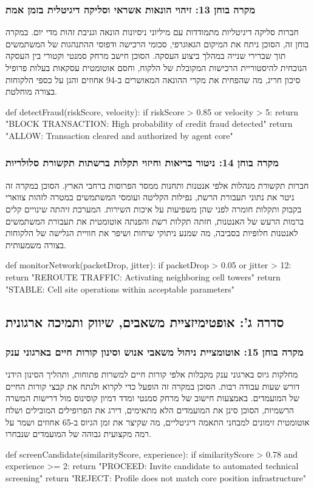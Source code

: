 \documentclass{hebrew-academic-template}
\begin{document}
\subsubsection{מקרה בוחן 13: זיהוי הונאות אשראי וסליקה דיגיטלית בזמן אמת}
חברות סליקה דיגיטליות מתמודדות עם מיליוני ניסיונות הונאה וגניבת זהות מדי יום. במקרה בוחן זה, הסוכן ניתח את המיקום הגאוגרפי, סכומי הרכישה ודפוסי ההתנהגות של המשתמשים תוך שברירי שנייה במהלך ביצוע העסקה. הסוכן חישב מרחק סמנטי וקטורי בין העסקה הנוכחית להיסטוריית הרכישות המקובלת של הלקוח, וחסם אוטומטית עסקאות בעלות פרופיל סיכון חריג, מה שהפחית את מקרי ההונאה המאושרים ב-94 אחוזים והגן על כספי הלקוחות בצורה מוחלטת.
\begin{pythonbox}
def detectFraud(riskScore, velocity):
    if riskScore > 0.85 or velocity > 5:
        return "BLOCK TRANSACTION: High probability of credit fraud detected"
    return "ALLOW: Transaction cleared and authorized by agent core"
\end{pythonbox}

\subsubsection{מקרה בוחן 14: ניטור בריאות וחיזוי תקלות ברשתות תקשורת סלולריות}
חברות תקשורת מנהלות אלפי אנטנות ותחנות ממסר הפרוסות ברחבי הארץ. הסוכן במקרה זה ניטר את נתוני תעבורת הרשת, נפילות הקליטה ועומסי המשתמשים במטרה לזהות צווארי בקבוק ותקלות חומרה לפני שהן משפיעות על איכות השירות. המערכת זיהתה שינויים קלים ברמות הרעש של האנטנות, חזתה תקלות רשת והפנתה אוטומטית את תעבורת המשתמשים לאנטנות חלופיות בסביבה, מה שמנע ניתוקי שיחות ושיפר את חוויית הגלישה של הלקוחות בצורה משמעותית.
\begin{pythonbox}
def monitorNetwork(packetDrop, jitter):
    if packetDrop > 0.05 or jitter > 12:
        return "REROUTE TRAFFIC: Activating neighboring cell towers"
    return "STABLE: Cell site operations within acceptable parameters"
\end{pythonbox}

\subsection{סדרה ג': אופטימיזציית משאבים, שיווק ותמיכה ארגונית}

\subsubsection{מקרה בוחן 15: אוטומציית ניהול משאבי אנוש וסינון קורות חיים בארגוני ענק}
מחלקות גיוס בארגוני ענק מקבלות אלפי קורות חיים למשרות פתוחות, ותהליך הסינון הידני דורש שעות עבודה רבות. הסוכן במקרה זה הופעל כדי לקרוא ולנתח את קבצי קורות החיים של המועמדים. באמצעות חישוב של מרחק סמנטי ומדד דמיון קוסינוס מול דרישות המשרה הרשמיות, הסוכן סינן את המועמדים הלא מתאימים, דירג את הפרופילים המובילים ושלח אוטומטית זימונים למבחני התאמה דיגיטליים, מה שקיצר את זמן הגיוס ב-65 אחוזים ושמר על רמה מקצועית גבוהה של המועמדים שנבחרו.
\begin{pythonbox}
def screenCandidate(similarityScore, experience):
    if similarityScore > 0.78 and experience >= 2:
        return "PROCEED: Invite candidate to automated technical screening"
    return "REJECT: Profile does not match core position infrastructure"
\end{pythonbox}
\end{document}
